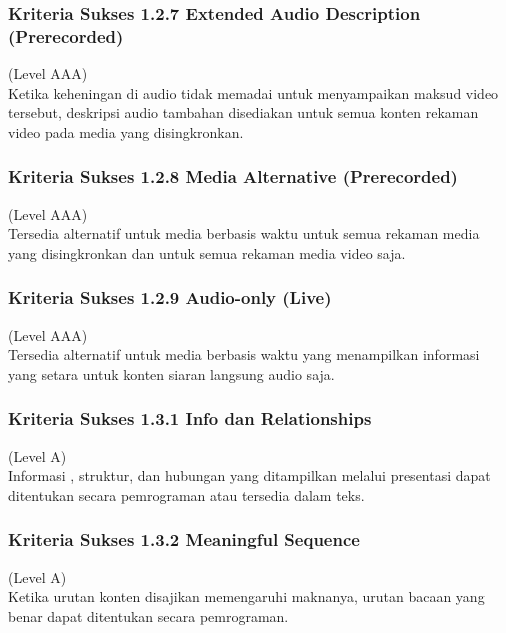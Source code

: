 \documentclass[a4paper,twoside]{article}
\begin{document}
\begin{enumerate}
		
		\subsubsection*{Kriteria Sukses 1.2.7 Extended Audio Description (Prerecorded)}
		\label{subsubsec:kriteria_1.2.7}
		(Level AAA) \\
		
		Ketika keheningan di audio tidak memadai untuk menyampaikan maksud video tersebut, deskripsi audio tambahan disediakan untuk semua konten rekaman video pada media yang disingkronkan. 
		
		
		\subsubsection*{Kriteria Sukses 1.2.8 Media Alternative (Prerecorded)}
		\label{subsubsec:kriteria_1.2.8}
		(Level AAA) \\
		
		Tersedia alternatif untuk media berbasis waktu untuk semua rekaman media yang disingkronkan dan untuk semua rekaman media video saja.
		
		\subsubsection*{Kriteria Sukses 1.2.9 Audio-only (Live)}
		\label{subsubsec:kriteria_1.2.9}
		(Level AAA) \\
		
		Tersedia alternatif untuk media berbasis waktu yang menampilkan informasi yang setara untuk konten siaran langsung audio saja.
		
		
		\subsubsection*{Kriteria Sukses 1.3.1 Info dan Relationships}
		\label{subsubsec:kriteria_1.3.1}
		(Level A) \\
		
		Informasi , struktur, dan hubungan yang ditampilkan melalui presentasi dapat ditentukan secara pemrograman atau tersedia dalam teks.
		
		
		\subsubsection*{Kriteria Sukses 1.3.2 Meaningful Sequence}
		\label{subsubsec:kriteria_1.3.2}
		(Level A) \\
		
		Ketika urutan konten disajikan memengaruhi maknanya, urutan bacaan yang benar dapat ditentukan secara pemrograman.
		

\end{enumerate}
\end{document}
